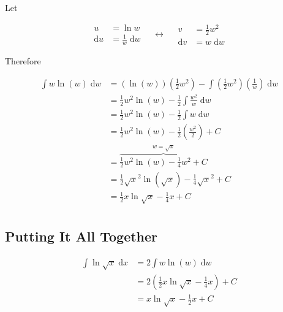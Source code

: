 \documentclass{article}
\begin{document}
Let

\begin{equation}
    \begin{split}
        u &= \ln w \\
        \mathrm{d}u &= \frac{1}{w} \;\mathrm{d}w
    \end{split}
    \quad\leftrightarrow\quad
    \begin{split}
        v &= \frac{1}{2} w^2 \\
        \mathrm{d}v &= w \;\mathrm{d}w
    \end{split}
\end{equation}

Therefore

\begin{equation}
\begin{split}
    \int w \ln(w) \;\mathrm{d}w
        &= \left(\ln(w)\right)\left(\frac{1}{2}w^2\right) - \int\left(\frac{1}{2}w^2\right)\left(\frac{1}{w}\right)\;\mathrm{d}w \\
        &= \frac{1}{2}w^2\ln(w) - \frac{1}{2}\int\frac{w^2}{w}\;\mathrm{d}w \\
        &= \frac{1}{2}w^2\ln(w) - \frac{1}{2}\int w\;\mathrm{d}w \\
        &= \frac{1}{2}w^2\ln(w) - \frac{1}{2}\left(\frac{w^2}{2}\right) + C \\
        &= \overbrace{\frac{1}{2}w^2\ln(w) - \frac{1}{4}w^2 + C}^{w = \sqrt{x}} \\
        &= \frac{1}{2}\sqrt{x}^2\ln(\sqrt{x}) - \frac{1}{4}\sqrt{x}^2 + C \\
        &= \frac{1}{2}x\ln\sqrt{x} - \frac{1}{4}x + C \\
\end{split}
\end{equation}

\subsection*{Putting It All Together}

\begin{equation}
\begin{split}
    \int\ln\sqrt{x} \;\mathrm{d}x
        &= 2\int w \ln(w) \;\mathrm{d}w \\
        &= 2\left(\frac{1}{2}x\ln\sqrt{x} - \frac{1}{4}x\right) + C \\
        &= x\ln\sqrt{x} - \frac{1}{2}x + C
\end{split}
\end{equation}


\end{document}
